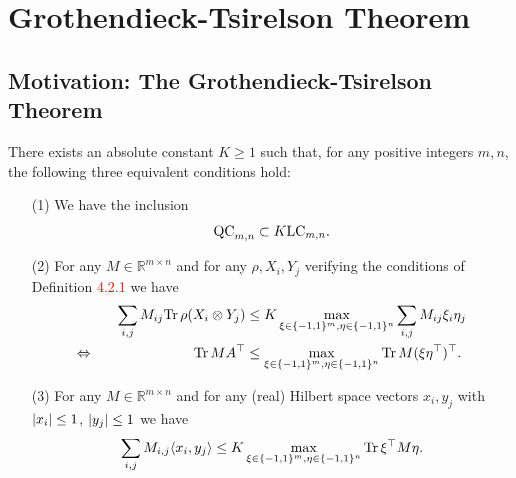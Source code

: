 \section{Grothendieck-Tsirelson Theorem}
\frame{\tableofcontents[currentsection]}

\subsection{Motivation: The Grothendieck-Tsirelson Theorem}
\frame{\tableofcontents[currentsubsection]}
	\begin{frame}
		\begin{theo}
			There exists an absolute constant $K\geq 1$ such that, for any positive integers $m,n$, the following three equivalent conditions hold:
			\begin{itemize}
				\item[(1)] We have the inclusion 
					\begin{equation}
						\textup{QC}_{m,n} \subset K\textup{LC}_{m,n}.
					\end{equation}
				\item[(2)] For any $M\in\mathbb{R}^{m\times n}$ and for any $\rho,X_i,Y_j$ verifying the conditions of Definition \textcolor{red}{4.2.1} we have
					\begin{align}
						\sum_{i,j} M_{ij} \textup{Tr} \, {\rho(X_i\otimes Y_j)}  &\leq K \max_{\xi\in\{-1,1\}^m,\eta\in\{-1,1\}^n} \sum_{i,j} M_{ij}\xi_i\eta_j \\
						\Leftrightarrow \hspace{2.5cm} \textup{Tr} \, {MA^\top}  &\leq \max_{\xi\in\{-1,1\}^m,\eta\in\{-1,1\}^n} \textup{Tr} \, {M(\xi\eta^\top)^\top} .
					\end{align}
					\item[(3)] For any $M\in\mathbb{R}^{m\times n}$ and for any (real) Hilbert space vectors $x_i,y_j$ with ${\left|{x_i}\right|}\leq 1$, ${\left|{y_j}\right|}\leq 1$ we have
						\begin{equation}
							\sum_{i,j} M_{i,j}\langle{x_i},{y_j}\rangle \leq K \max_{\xi\in\{-1,1\}^m,\eta\in\{-1,1\}^n} \textup{Tr} \, {\xi^\top M \eta} . \label{eq:G_ineq}
						\end{equation}
			\end{itemize}
		\end{theo}
	\end{frame}

